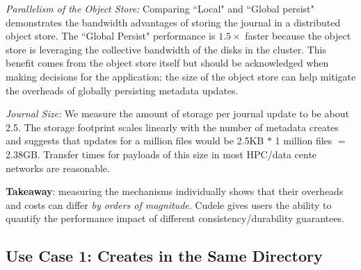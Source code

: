 {\it Parallelism of the Object Store:} Comparing ``Local" and ``Global
persist" demonstrates the bandwidth advantages of storing the journal in a
distributed object store. The ``Global Persist"
performance is \(1.5\times\) faster because the object store is leveraging the
collective bandwidth of the disks in the cluster. This benefit comes from the
object store itself but should be acknowledged when making decisions for the
application; the size of the object store can help mitigate the overheads of
globally persisting metadata updates.

{\it Journal Size:} We measure the amount of storage per journal update to be
about 2.5. The storage footprint scales linearly with the number of
metadata creates and suggests that updates for a million files would be 2.5KB
\(*\) 1 million files \(=\) 2.38GB. Transfer times for payloads of this size in
most HPC/data cente networks are reasonable.

\textbf{Takeaway}: measuring the mechanisms individually shows that
their overheads and costs can differ {\it by orders of magnitude}. Cudele gives
users the ability to quantify the performance impact of different
consistency/durability guarantees.\\

\subsection{Use Case 1: Creates in the Same Directory}
\label{sec:use-case-1}

